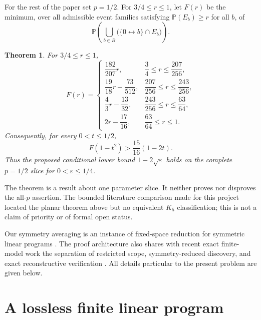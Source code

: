 \documentclass[11pt]{article}
\newtheorem{theorem}{Theorem}
\newcommand{\Prob}{\mathbb P}
\begin{document}
For the rest of the paper set $p=1/2$.  For $3/4\leq r\leq1$, let $F(r)$ be
the minimum, over all admissible event families satisfying
$\Prob(E_b)\geq r$ for all $b$, of
\begin{equation}\label{eq:success}
 \Prob\!\left(\bigcup_{b\in B}
   \bigl(\{0\leftrightarrow b\}\cap E_b\bigr)\right).
\end{equation}

\begin{theorem}\label{thm:main}
For $3/4\leq r\leq1$,
\begin{equation}\label{eq:formula}
F(r)=
\begin{cases}
\dfrac{182}{207}r,
  &\dfrac34\leq r\leq\dfrac{207}{256},\\[5pt]
\dfrac{19}{18}r-\dfrac{73}{512},
  &\dfrac{207}{256}\leq r\leq\dfrac{243}{256},\\[5pt]
\dfrac43r-\dfrac{13}{32},
  &\dfrac{243}{256}\leq r\leq\dfrac{63}{64},\\[5pt]
2r-\dfrac{17}{16},
  &\dfrac{63}{64}\leq r\leq1.
\end{cases}
\end{equation}
Consequently, for every $0<t\leq1/2$,
\begin{equation}\label{eq:modulus}
 F(1-t^2)>\frac{15}{16}(1-2t).
\end{equation}
Thus the proposed conditional lower bound $1-2\sqrt\varepsilon$ holds on the
complete $p=1/2$ slice for $0<\varepsilon\leq1/4$.
\end{theorem}

The theorem is a result about one parameter slice.  It neither proves nor
disproves the all-$p$ assertion.  The bounded literature comparison made for
this project located the planar theorem above but no equivalent $K_5$
classification; this is not a claim of priority or of formal open status.

Our symmetry averaging is an instance of fixed-space reduction for symmetric
linear programs \cite{BodiHerrJoswig2013}.  The proof architecture also shares
with recent exact finite-model work the separation of restricted scope,
symmetry-reduced discovery, and exact reconstructive verification
\cite{ZengEtAl2026Finite}.  All details particular to the present problem are
given below.

\section{A lossless finite linear program}
\end{document}
